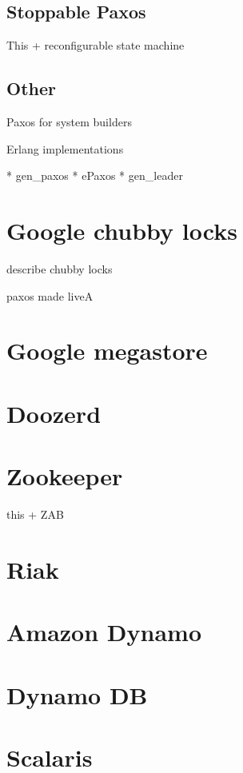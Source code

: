 \subsection{Stoppable Paxos}

This + reconfigurable state machine

\subsection{Other}

Paxos for system builders

Erlang implementations

* gen\_paxos
* ePaxos
* gen\_leader

\section{Google chubby locks}

describe chubby locks

paxos made liveA

\section{Google megastore}

\section{Doozerd}

\section{Zookeeper}

this + ZAB

\section{Riak}

\section{Amazon Dynamo}

\section{Dynamo DB}

\section{Scalaris}

